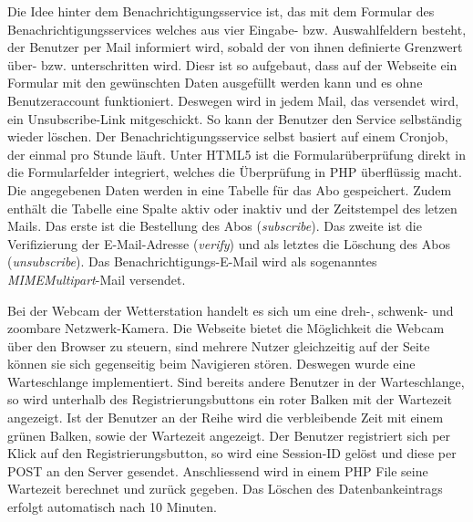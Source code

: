 \documentclass[10pt]{article}
\begin{document}
\begin{multicols}{2}
Die Idee hinter dem Benachrichtigungsservice ist, das mit dem  Formular des Benachrichtigungsservices welches aus vier Eingabe- bzw. Auswahlfeldern besteht, der Benutzer per Mail informiert wird, sobald der von ihnen definierte Grenzwert über- bzw. unterschritten wird.  Diesr ist so aufgebaut, dass auf der Webseite ein Formular mit den gewünschten Daten ausgefüllt werden kann und es ohne Benutzeraccount funktioniert. Deswegen wird in jedem Mail, das versendet wird, ein Unsubscribe-Link mitgeschickt. So kann der Benutzer den Service selbständig wieder löschen. Der Benachrichtigungsservice selbst basiert auf einem Cronjob, der einmal pro Stunde läuft.  Unter HTML5 ist die Formularüberprüfung direkt in die Formularfelder integriert, welches die Überprüfung in PHP überflüssig macht. Die angegebenen Daten werden in eine Tabelle für das Abo gespeichert. Zudem enthält die Tabelle eine Spalte aktiv oder inaktiv und der Zeitstempel des letzen Mails. Das erste ist die Bestellung des Abos (\textit{subscribe}). Das zweite ist die Verifizierung der E-Mail-Adresse (\textit{verify}) und als letztes die Löschung des Abos (\textit{unsubscribe}). Das Benachrichtigungs-E-Mail wird als sogenanntes \emph{MIMEMultipart}-Mail versendet.

Bei der Webcam der Wetterstation handelt es sich um eine dreh-, schwenk- und zoombare Netzwerk-Kamera. Die Webseite bietet die Möglichkeit die Webcam über den Browser zu steuern, sind mehrere Nutzer gleichzeitig auf der Seite können sie sich gegenseitig beim Navigieren stören. Deswegen wurde eine Warteschlange implementiert. Sind bereits andere Benutzer in der Warteschlange, so wird unterhalb des  Registrierungsbuttons ein roter Balken mit der Wartezeit angezeigt. Ist der Benutzer an der Reihe wird die verbleibende Zeit mit einem grünen Balken, sowie der Wartezeit angezeigt. Der Benutzer registriert sich per Klick auf den Registrierungsbutton, so wird eine Session-ID gelöst und diese per POST an den Server gesendet. Anschliessend wird in einem PHP File seine Wartezeit berechnet und zurück gegeben. Das Löschen des Datenbankeintrags erfolgt automatisch nach 10 Minuten.
\end{multicols}
 
\end{document}
